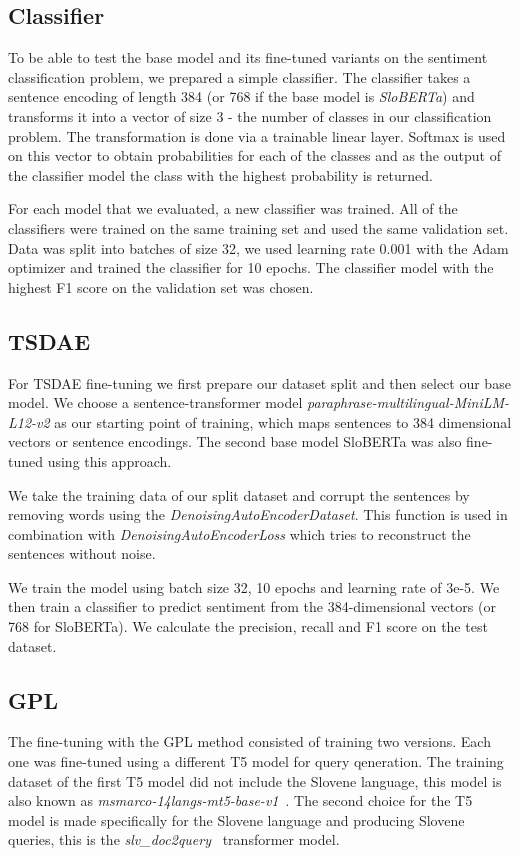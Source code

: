 \documentclass[fleqn,moreauthors,10pt]{ds_report}
\begin{document}
\subsection*{Classifier}

To be able to test the base model and its fine-tuned variants on the sentiment classification problem, we prepared a simple classifier. The classifier takes a sentence encoding of length 384 (or 768 if the base model is {\it SloBERTa}) and transforms it into a vector of size 3 - the number of classes in our classification problem. The transformation is done via a trainable linear layer. Softmax is used on this vector to obtain probabilities for each of the classes and as the output of the classifier model the class with the highest probability is returned.

For each model that we evaluated, a new classifier was trained. All of the classifiers were trained on the same training set and used the same validation set. Data was split into batches of size 32, we used learning rate 0.001 with the Adam optimizer and trained the classifier for 10 epochs. The classifier model with the highest F1 score on the validation set was chosen.


\subsection*{TSDAE}

For TSDAE fine-tuning we first prepare our dataset split and then select our base model.
We choose a sentence-transformer model {\it paraphrase-multilingual-MiniLM-L12-v2} as our starting point of training, which maps sentences to 384 dimensional vectors or sentence encodings. The second base model SloBERTa was also fine-tuned using this approach.

We take the training data of our split dataset and corrupt the sentences by removing words using the {\it DenoisingAutoEncoderDataset}. This function is used in combination with {\it DenoisingAutoEncoderLoss} which tries to reconstruct the sentences without noise.

We train the model using batch size 32, 10 epochs and learning rate of 3e-5. We then train a classifier to predict sentiment from the 384-dimensional vectors (or 768 for SloBERTa). We calculate the precision, recall and F1 score on the test dataset.


\subsection*{GPL}
The fine-tuning with the GPL method consisted of training two versions. Each one was fine-tuned using a different T5 model for query qeneration. The training dataset of the first T5 model did not include the Slovene language, this model is also known as {\it msmarco-14langs-mt5-base-v1}~\cite{msmarco14langs}. The second choice for the T5 model is made specifically for the Slovene language and producing Slovene queries, this is the {\it slv\_doc2query}~\cite{boshko} transformer model.
\end{document}
